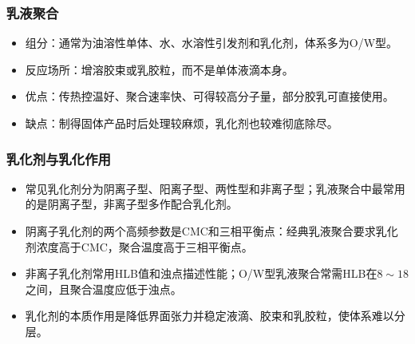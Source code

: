 ﻿\documentclass[12pt,a4paper]{article}
\begin{document}
\subsubsection{乳液聚合}
\begin{itemize}
  \item 组分：通常为油溶性单体、水、水溶性引发剂和乳化剂，体系多为O/W型。
  \item 反应场所：增溶胶束或乳胶粒，而不是单体液滴本身。
  \item 优点：传热控温好、聚合速率快、可得较高分子量，部分胶乳可直接使用。
  \item 缺点：制得固体产品时后处理较麻烦，乳化剂也较难彻底除尽。
\end{itemize}

\subsubsection{乳化剂与乳化作用}
\begin{itemize}
  \item 常见乳化剂分为阴离子型、阳离子型、两性型和非离子型；乳液聚合中最常用的是阴离子型，非离子型多作配合乳化剂。
  \item 阴离子乳化剂的两个高频参数是CMC和三相平衡点：经典乳液聚合要求乳化剂浓度高于CMC，聚合温度高于三相平衡点。
  \item 非离子乳化剂常用HLB值和浊点描述性能；O/W型乳液聚合常需HLB在$8\sim18$之间，且聚合温度应低于浊点。
  \item 乳化剂的本质作用是降低界面张力并稳定液滴、胶束和乳胶粒，使体系难以分层。
\end{itemize}
\end{document}
